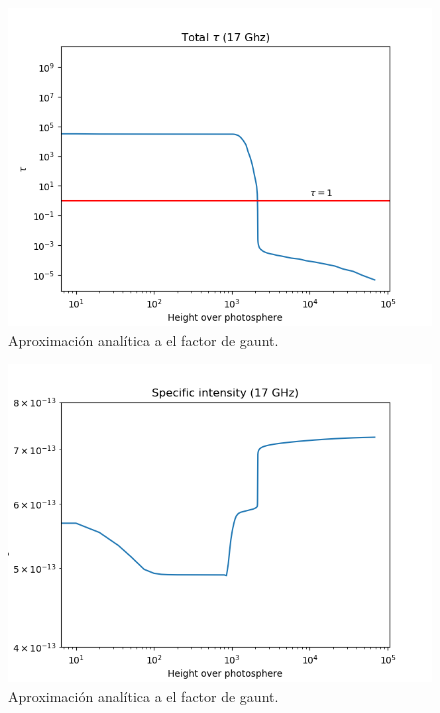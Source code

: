 \documentclass[a4paper]{article}
\begin{document}


\begin{figure}[!htbp]
\begin{center}
\includegraphics[width=15cm]{tau_total.png}
\end{center}
\caption{Aproximación analítica a el factor de gaunt.}\label{tau}
\end{figure}

\begin{figure}[!htbp]
\begin{center}
\includegraphics[width=15cm]{ispec.png}
\end{center}
\caption{Aproximación analítica a el factor de gaunt.}\label{ispec}
\end{figure}

%
%
\end{document}
